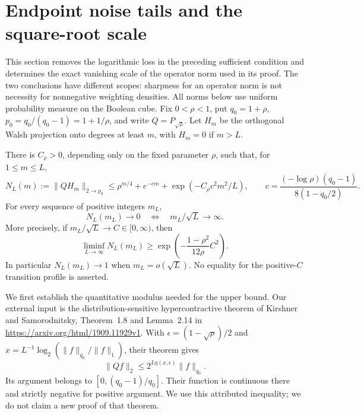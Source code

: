 \section{Endpoint noise tails and the square-root scale}
\label{sec:square-root-tail}
This section removes the logarithmic loss in the preceding sufficient
condition and determines the exact vanishing scale of the operator norm
used in its proof. The two conclusions have different scopes: sharpness
for an operator norm is not necessity for nonnegative weighting densities.
All norms below use uniform probability measure on the Boolean cube.
Fix $0<\rho<1$, put $q_0=1+\rho$, $p_0=q_0/(q_0-1)=1+1/\rho$,
and write $Q=P_{\sqrt\rho}$. Let $H_m$ be the orthogonal Walsh projection
onto degrees at least $m$, with $H_m=0$ if $m>L$.

\begin{theorem}
\label{thm:square-root-tail}
There is $C_\rho>0$, depending only on the fixed parameter $\rho$, such that,
for $1\leq m\leq L$,
\begin{equation}\label{eq:327-tail-upper}
 N_L(m):=\|QH_m\|_{2\to p_0}
 \leq \rho^{m/4}+e^{-cm}+\exp(-C_\rho c^2m^2/L),
 \qquad c=\frac{(-\log\rho)(q_0-1)}{8(1-q_0/2)}.
\end{equation}
For every sequence of positive integers $m_L$,
\[
 N_L(m_L)\longrightarrow0
 \quad\Longleftrightarrow\quad m_L/\sqrt L\longrightarrow\infty.
\]
More precisely, if $m_L/\sqrt L\to C\in[0,\infty)$, then
\begin{equation}\label{eq:327-tail-lower}
 \liminf_{L\to\infty}N_L(m_L)
 \geq \exp\!\left(-\frac{1-\rho^2}{12\rho}C^2\right).
\end{equation}
In particular $N_L(m_L)\to1$ when $m_L=o(\sqrt L)$.
No equality for the positive-$C$ transition profile is asserted.
\end{theorem}

We first establish the quantitative modulus needed for the upper bound.
Our external input is the distribution-sensitive hypercontractive theorem
of Kirshner and Samorodnitsky, Theorem~1.8 and Lemma~2.14 in
\url{https://arxiv.org/html/1909.11929v1}. With
$\epsilon=(1-\sqrt\rho)/2$ and
$x=L^{-1}\log_2(\|f\|_{q_0}/\|f\|_1)$, their theorem gives
\begin{equation}\label{eq:327-KS}
 \|Qf\|_2\leq 2^{L\eta(x,\epsilon)}\|f\|_{q_0}.
\end{equation}
Its argument belongs to $[0,(q_0-1)/q_0]$. Their function is continuous
there and strictly negative for positive argument. We use this attributed
inequality; we do not claim a new proof of that theorem.

